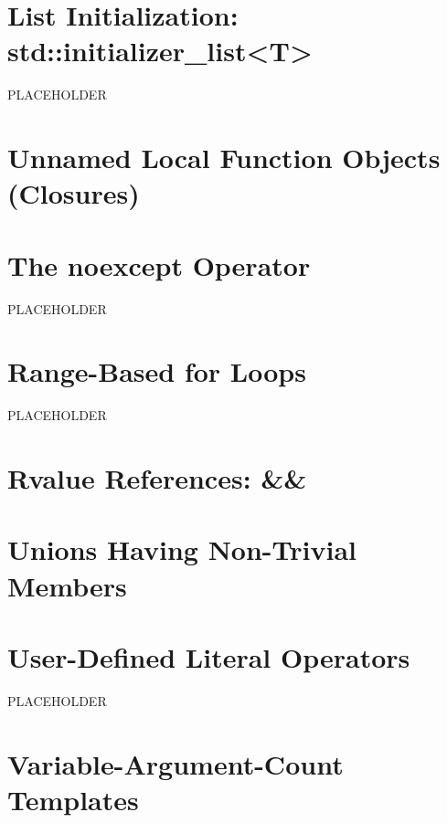 \newpage
\section[{\tt initializer\_list}]{List Initialization: {\SecCode std::initializer\_list<T>}}%
%
PLACEHOLDER

\newpage
\section[Lambdas]{Unnamed Local Function Objects (Closures)}\label{lambda}


\newpage
\section[{\tt noexcept} Operator]{The {\SecCode noexcept} Operator}%
%
PLACEHOLDER

\newpage
\section[Range {\tt for}]{Range-Based {\SecCode for} Loops}%
%
PLACEHOLDER

\newpage
\section[{\itshape rvalue} References]{Rvalue References: {\SecCode \&\&}}\label{Rvalue-References}


\newpage
\section[{\tt union} '11]{Unions Having Non-Trivial Members}\label{unrestricted-unions}


\newpage
\section[User-Defined Literals]{User-Defined Literal Operators}%
%
PLACEHOLDER

\newpage
\section[Variadic Templates]{Variable-Argument-Count Templates}\label{variadictemplate}



